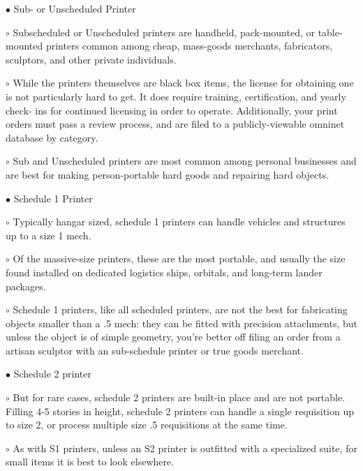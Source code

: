     $\bullet$    Sub- or Unscheduled Printer

             $\circ$     Subscheduled or Unscheduled printers are handheld, pack-mounted, or table-
                 mounted printers common among cheap, mass-goods merchants, fabricators,
                 sculptors, and other private individuals.





         $\circ$     While the printers themselves are black box items, the license for obtaining one is
             not particularly hard to get. It does require training, certification, and yearly check-
             ins for continued licensing in order to operate. Additionally, your print orders must
             pass a review process, and are filed to a publicly-viewable omninet database by
             category.

         $\circ$     Sub and Unscheduled printers are most common among personal businesses and
             are best for making person-portable hard goods and repairing hard objects.

$\bullet$    Schedule 1 Printer

         $\circ$     Typically hangar sized, schedule 1 printers can handle vehicles and structures up
             to a size 1 mech.

         $\circ$     Of the massive-size printers, these are the most portable, and usually the size
             found installed on dedicated logistics ships, orbitals, and long-term lander
             packages.

         $\circ$     Schedule 1 printers, like all scheduled printers, are not the best for fabricating
             objects smaller than a .5 mech: they can be fitted with precision attachments, but
             unless the object is of simple geometry, you’re better off filing an order from a
             artisan sculptor with an sub-schedule printer or true goods merchant.



$\bullet$    Schedule 2 printer

         $\circ$     But for rare cases, schedule 2 printers are built-in place and are not portable.
             Filling 4-5 stories in height, schedule 2 printers can handle a single requisition up
             to size 2, or process multiple size .5 requisitions at the same time.

         $\circ$     As with S1 printers, unless an S2 printer is outfitted with a specialized suite, for
             small items it is best to look elsewhere.

